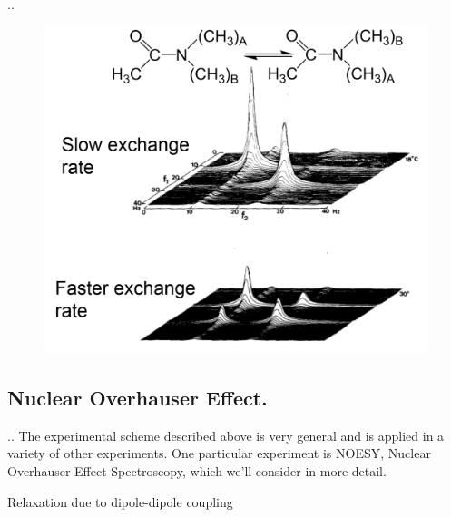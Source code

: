 \documentclass{beamer}
\begin{document}
\begin{frame}{\thesection.\thesubsection. \insertsubsection}
  \begin{figure}
  	\centering
  	\includegraphics[scale=0.4]{figures/NNdimethylacetamide.png}
  \end{figure}


\end{frame}

\subsection{Nuclear Overhauser Effect.}
\begin{frame}{\thesection.\thesubsection. \insertsubsection}
   The experimental scheme described above is very general and is applied in a variety of other experiments. One particular experiment is \alert{NOESY, Nuclear Overhauser Effect Spectroscopy,} which we'll consider in more detail.
   
   Relaxation due to dipole-dipole coupling 
   
\end{frame}
\end{document}
